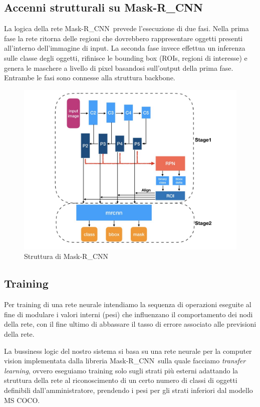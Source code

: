 \documentclass[12pt,a4paper]{article}
\newcommand{\mrcnn}{Mask-R\_CNN}
\begin{document}
\subsection{Accenni strutturali su \mrcnn}

La logica della rete \mrcnn\ prevede l'esecuzione di due fasi. Nella
prima fase la rete ritorna delle regioni che dovrebbero rappresentare
oggetti presenti all'interno dell'immagine di input. La seconda fase
invece effettua un inferenza sulle classe degli oggetti, rifinisce le
bounding box (ROIs, regioni di interesse) e genera le maschere a livello
di pixel basandosi sull'output della prima fase. Entrambe le fasi sono
connesse alla struttura backbone.

\begin{figure}[H]
    \caption{Struttura di \mrcnn}
    \centering
    \includegraphics[width=\textwidth,height=\textheight,keepaspectratio]{mask_description.jpg}
\end{figure}

\subsection{Training}
\label{s:training}

Per training di una rete neurale intendiamo la sequenza di operazioni
eseguite al fine di modulare i valori interni (pesi) che influenzano il
comportamento dei nodi della rete, con il fine ultimo di abbassare il
tasso di errore associato alle previsioni della rete.

La bussiness logic del nostro sistema si basa su una rete neurale per la
computer vision implementata dalla libreria \mrcnn\ sulla quale facciamo
\textit{transfer learning}, ovvero eseguiamo training solo sugli strati
più esterni adattando la struttura della rete al riconoscimento di un
certo numero di classi di oggetti definibili dall'amministratore,
prendendo i pesi per gli strati inferiori dal modello MS COCO.
\end{document}
